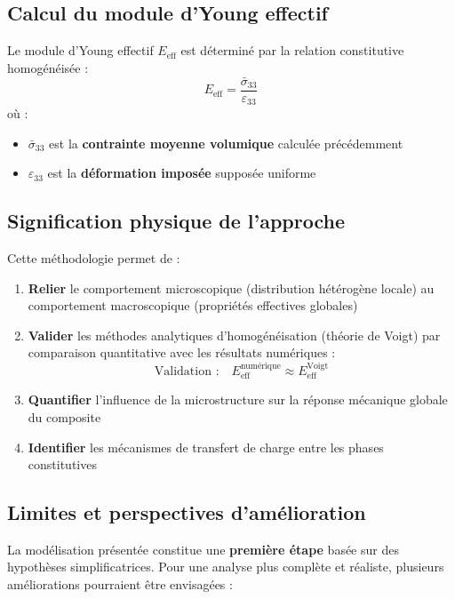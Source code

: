 \documentclass{rapportECL}
\begin{document}
\subsection{Calcul du module d'Young effectif}

Le module d'Young effectif \(E_{\text{eff}}\) est déterminé par la relation constitutive homogénéisée :
\[
\boxed{E_{\text{eff}} = \frac{\bar{\sigma}_{33}}{\varepsilon_{33}}}
\]
où :
\begin{itemize}
    \item \(\bar{\sigma}_{33}\) est la \textbf{contrainte moyenne volumique} calculée précédemment
    \item \(\varepsilon_{33}\) est la \textbf{déformation imposée} supposée uniforme
\end{itemize}

\subsection{Signification physique de l'approche}

Cette méthodologie permet de :

\begin{enumerate}
    \item \textbf{Relier} le comportement microscopique (distribution hétérogène locale) au comportement macroscopique (propriétés effectives globales)
    
    \item \textbf{Valider} les méthodes analytiques d'homogénéisation (théorie de Voigt) par comparaison quantitative avec les résultats numériques :
    \[
    \text{Validation :} \quad E_{\text{eff}}^{\text{numérique}} \approx E_{\text{eff}}^{\text{Voigt}}
    \]
    
    \item \textbf{Quantifier} l'influence de la microstructure sur la réponse mécanique globale du composite
    
    \item \textbf{Identifier} les mécanismes de transfert de charge entre les phases constitutives
\end{enumerate}

\subsection{Limites et perspectives d'amélioration}

La modélisation présentée constitue une \textbf{première étape} basée sur des hypothèses simplificatrices. Pour une analyse plus complète et réaliste, plusieurs améliorations pourraient être envisagées :
\end{document}
